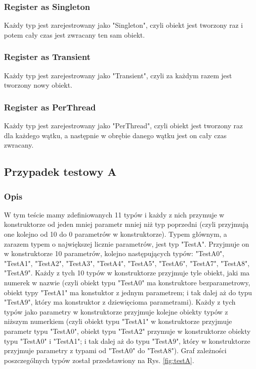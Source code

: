 \documentclass[12pt]{article}
\begin{document}
\subsubsection{Register as Singleton}
Każdy typ jest zarejestrowany jako "Singleton", czyli obiekt jest tworzony raz i potem cały czas jest zwracany ten sam obiekt.

\subsubsection{Register as Transient}
Każdy typ jest zarejestrowany jako "Transient", czyli za każdym razem jest tworzony nowy obiekt.

\subsubsection{Register as PerThread}
Każdy typ jest zarejestrowany jako "PerThread", czyli obiekt jest tworzony raz dla każdego wątku, a następnie w obrębie danego wątku jest on cały czas zwracany.

\subsection{Przypadek testowy A}
\subsubsection{Opis}
W tym teście mamy zdefiniowanych 11 typów i każdy z nich przymuje w konstruktorze od jeden mniej parametr mniej niż typ poprzedni (czyli przyjmują one kolejno od 10 do 0 parametrów w konstruktorze). Typem głównym, a zarazem typem o największej licznie parametrów, jest typ "TestA". Przyjmuje on w konstruktorze 10 parametrów, kolejno następujących typów: "TestA0", "TestA1", "TestA2", "TestA3", "TestA4", "TestA5", "TestA6", "TestA7", "TestA8", "TestA9". Każdy z tych 10 typów w konstruktorze przyjmuje tyle obiekt, jaki ma numerek w nazwie (czyli obiekt typu "TestA0" ma konstruktore bezparametrowy, obiekt typy "TestA1" ma konstuktor z jednym parametrem; i tak dalej aż do typu "TestA9", który ma konstruktor z dziewięcioma parametrami). Każdy z tych typów jako parametry w konstruktorze przyjmuje kolejne obiekty typów z niższym numerkiem (czyli obiekt typu "TestA1" w konstruktorze przyjmuje parametr typu "TestA0", obiekt typu "TestA2" przymuje w konstruktorze obiekty typu "TestA0" i "TestA1";  i tak dalej aż do typu "TestA9", który w konstruktorze przyjmuje parametry z typami od "TestA0" do "TestA8"). Graf zależności poszczególnych typów został przedstawiony na Rys. \ref{fig:testA}.\\
\end{document}

